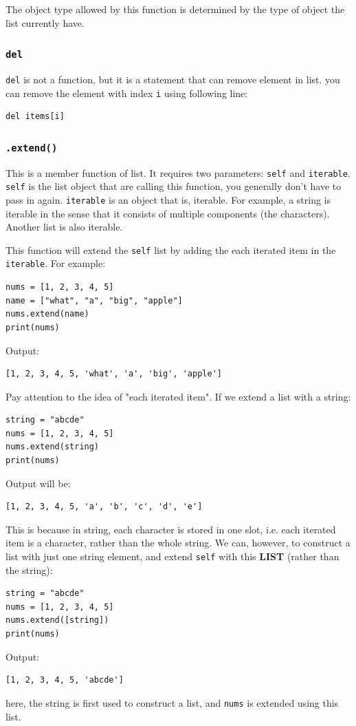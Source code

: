 \documentclass[12pt]{book}
\begin{document}
The object type allowed by this function is determined by the type of object the list currently have.
\subsubsection{\texttt{del}}
\label{sec:org0dcbb9e}
\texttt{del} is not a function, but it is a statement that can remove element in list. you can remove the element with index \texttt{i} using following line:
\begin{verbatim}
del items[i]
\end{verbatim}
\subsubsection{\texttt{.extend()}}
\label{sec:org28b1be3}
This is a member function of list. It requires two parameters: \texttt{self} and \texttt{iterable}. \texttt{self} is the list object that are calling this function, you generally don't have to pass in again. \texttt{iterable} is an object that is, iterable. For example, a string is iterable in the sense that it consists of multiple components (the characters). Another list is also iterable.

This function will extend the \texttt{self} list by adding the each iterated item in the \texttt{iterable}. For example:
\begin{verbatim}
nums = [1, 2, 3, 4, 5]
name = ["what", "a", "big", "apple"]
nums.extend(name)
print(nums)
\end{verbatim}
Output:
\begin{verbatim}
[1, 2, 3, 4, 5, 'what', 'a', 'big', 'apple']
\end{verbatim}

Pay attention to the idea of "each iterated item". If we extend a list with a string:
\begin{verbatim}
string = "abcde"
nums = [1, 2, 3, 4, 5]
nums.extend(string)
print(nums)
\end{verbatim}
Output will be:
\begin{verbatim}
[1, 2, 3, 4, 5, 'a', 'b', 'c', 'd', 'e']
\end{verbatim}
This is because in string, each character is stored in one slot, i.e. each iterated item is a character, rather than the whole string. We can, however, to construct a list with just one string element, and extend \texttt{self} with this \textbf{LIST} (rather than the string):
\begin{verbatim}
string = "abcde"
nums = [1, 2, 3, 4, 5]
nums.extend([string])
print(nums)
\end{verbatim}
Output:
\begin{verbatim}
[1, 2, 3, 4, 5, 'abcde']
\end{verbatim}
here, the string is first used to construct a list, and \texttt{nums} is extended using this list.
\end{document}
